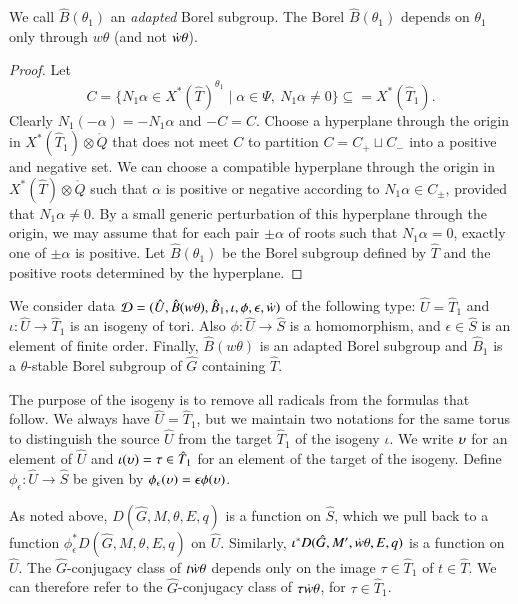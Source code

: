 We call $\hat B(\theta_1)$ an {\it adapted} Borel subgroup.
The Borel $\hat B(\theta_1)$ depends on $\theta_1$ only through
$w\theta$ (and not $\dot w \theta$).

\begin{proof}  Let 
\[
C = \{N_1\alpha\in X^*(\hat T)^{\theta_1} \mid \alpha\in\Psi,\ N_1\alpha\ne 0\}
\subseteq =X^*(\hat T_1).
\]
Clearly $N_1(-\alpha)= - N_1\alpha$ and $-C = C$.  Choose a hyperplane
through the origin in $X^*(\hat T_1)\otimes\ring{Q}$ that does not
meet $C$ to partition $C = C_+ \sqcup C_-$ into a positive and
negative set.  We can choose a compatible hyperplane through the
origin in $X^*(\hat T)\otimes\ring{Q}$ such that $\alpha$ is positive
or negative according to $N_1\alpha\in C_\pm$, provided that
$N_1\alpha\ne 0$.  By a small generic perturbation of this hyperplane
through the origin, we may assume that for each pair $\pm\alpha$ of
roots such that $N_1\alpha=0$, exactly one of $\pm\alpha$ is positive.
Let $\hat B(\theta_1)$ be the Borel subgroup defined by $\hat T$ and
the positive roots determined by the hyperplane.
\end{proof}

We consider data $\mathcal D=(\hat U,\hat B(w\theta),\hat
B_1,\iota,\phi,\epsilon,\dot w)$ of the following type: $\hat U = \hat
T_1$ and $\iota:\hat U\to \hat T_1$ is an isogeny of tori.  Also
$\phi:\hat U\to \hat S$ is a homomorphism, and $\epsilon\in \hat S$ is
an element of finite order.  Finally, $\hat B(w\theta)$ is an
adapted Borel subgroup and $\hat B_1$ is a $\theta$-stable
Borel subgroup of $\hat G$ containing $\hat T$.


The purpose of the isogeny is to remove all radicals from the formulas that follow.
We always have $\hat U = \hat T_1$, but we maintain two notations for
the same torus to distinguish the source $\hat U$ from the target
$\hat T_1$ of the isogeny $\iota$.  We write $\upsilon$ for an element of
$\hat U$ and $\iota(\upsilon)=\tau\in \hat T_1$ for an element of the target of the
isogeny.  Define $\phi_\epsilon:\hat U\to\hat S$ be given by $\phi_\epsilon(\upsilon)=
\epsilon\phi(\upsilon)$.

As noted above,
$D(\hat G,M,\theta,E,q)$ is a function on $\hat S$, which we pull back
to a function $\phi^*_\epsilon D(\hat G,M,\theta,E,q)$ on $\hat U$.
Similarly, $\iota^* D(\hat G,M',\dot w \theta,E,q)$ is a function on
$\hat U$.  The $\hat G$-conjugacy class of $t\dot w \theta$ depends
only on the image $\tau\in \hat T_1$ of $t\in \hat T$.  We can
therefore refer to the $\hat G$-conjugacy class of $\tau\dot w\theta$,
for $\tau\in \hat T_1$.

